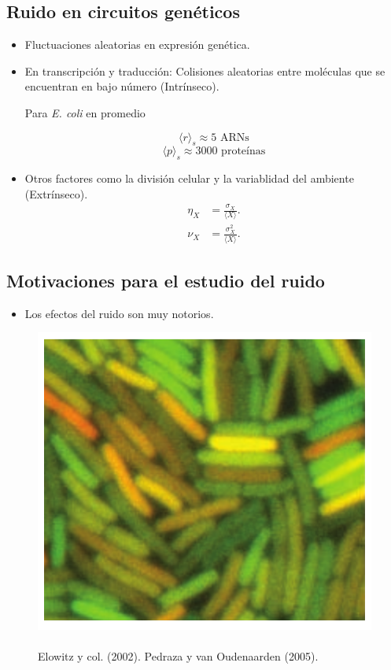 \documentclass[xcolor=dvipsnames]{beamer}
\begin{document}
\subsection{Ruido en circuitos gen\'eticos}
\begin{frame}
\begin{itemize}
\item Fluctuaciones aleatorias en expresi\'on gen\'etica.
\item En transcripci\'on y traducci\'on: Colisiones aleatorias entre mol\'eculas que se encuentran en bajo n\'umero (Intr\'inseco).

Para \textit{E. coli} en promedio

$$\langle r\rangle_s \approx 5 \text{ ARNs}$$
$$\langle p\rangle_s \approx 3000 \text{ prote\'inas}$$

\item Otros factores como la divisi\'on celular y la variablidad del ambiente (Extr\'inseco).
\begin{align*}
\eta_X &= \frac{\sigma_X}{\langle X \rangle}.\\[1.5ex]
\nu_X &= \frac{\sigma^2_X}{\langle X \rangle}.
\end{align*}
\end{itemize}
\end{frame}

\subsection{Motivaciones para el estudio del ruido}
\begin{frame}

\begin{itemize}
\item Los efectos del ruido son muy notorios.
\end{itemize}

\begin{figure}[p]
    \centering
    \includegraphics[width=\textwidth]{int-noise1}~\\
    \tiny Elowitz y col. (2002). Pedraza y van Oudenaarden (2005).
\end{figure}
\end{frame}
\end{document}
